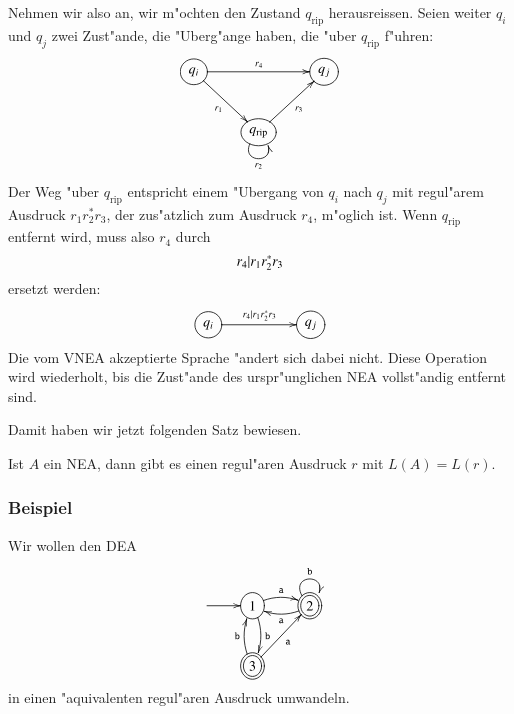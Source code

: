 Nehmen wir also an, wir m"ochten den Zustand $q_ {\text{rip}}$
herausreissen. Seien weiter $q_i$ und $q_j$ zwei Zust"ande, die
"Uberg"ange haben, die "uber $q_{\text{rip}}$ f"uhren:
\[
\entrymodifiers={++[o][F]}
\xymatrix{
{q_i}\ar[rr]^{r_4} \ar[dr]_{r_1}
	&*+\txt{}
		&{q_j}
\\
*+\txt{}
	&{q_{\text{rip}}}\ar[ur]_{r_3} \ar@(dl,dr)_{r_2}
}
\]
Der Weg "uber $q_{\text{rip}}$ entspricht einem "Ubergang
von $q_i$ nach $q_j$ mit regul"arem Ausdruck $r_1r_2^*r_3$,
der zus"atzlich zum Ausdruck $r_4$, m"oglich ist. Wenn $q_{\text{rip}}$
entfernt wird, muss also $r_4$ durch 
\[
r_4{\tt |}r_1r_2^{\tt *}r_3
\]
ersetzt werden:
\[
\entrymodifiers={++[o][F]}
\xymatrix{
{q_i}\ar[rr]^{r_4|r_1r_2^*r_3}
	&*+\txt{}
		&{q_j}
}
\]
Die vom VNEA akzeptierte Sprache "andert sich dabei nicht.
Diese Operation wird wiederholt, bis die Zust"ande des urspr"unglichen
NEA vollst"andig entfernt sind.

Damit  haben wir jetzt folgenden Satz bewiesen.
\begin{satz}
Ist $A$ ein NEA, dann gibt es einen regul"aren Ausdruck $r$ mit
$L(A)=L(r)$.
\end{satz}

\subsubsection{Beispiel}
Wir wollen den DEA
\[
\entrymodifiers={++[o][F]}
\xymatrix{
*+\txt{}\ar[r]
	&{1}\ar@/^/[r]^{\tt a} \ar@/^/[d]^{\tt b}
		&*++[o][F=]{2} \ar@(ul,ur)^{\tt b} \ar@/^/[l]^{\tt a}
\\
*+\txt{}
	&*++[o][F=]{3} \ar[ur]_{\tt a} \ar@/^/[u]^{\tt b}
}
\]
in einen "aquivalenten regul"aren Ausdruck umwandeln.

